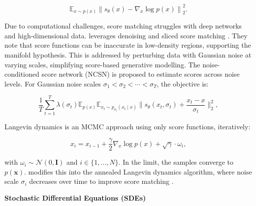 \documentclass[preprint,12pt,authoryear]{elsarticle}
\begin{document}
\begin{equation}
	\label{ncsn}
	\mathbb{E}_{x \sim p(x)}\left\|s_\theta(x)-\nabla_x \log p(x)\right\|_2^2 .
\end{equation}

Due to computational challenges, score matching struggles with deep networks and high-dimensional data. \cite{77_diffusion} leverages denoising and sliced score matching \cite{80_score_matching,79_sliced_score}. They note that score functions can be inaccurate in low-density regions, supporting the manifold hypothesis. This is addressed by perturbing data with Gaussian noise at varying scales, simplifying score-based generative modelling. The noise-conditioned score network (NCSN) is proposed to estimate scores across noise levels. For Gaussian noise scales $\sigma_1<\sigma_2<\cdots<\sigma_T$, the objective is:

\begin{equation}
	\frac{1}{T} \sum_{t=1}^T \lambda(\sigma_t) \mathbb{E}_{p(x)} \mathbb{E}_{x_t \sim p_{\sigma_t}(x_t \mid x)}\|s_\theta(x_t, \sigma_t)+\frac{x_t-x}{\sigma_t}\|_2^2,
\end{equation}

Langevin dynamics \cite{81_dynamics,82_dynamics} is an MCMC approach using only score functions, iteratively:

\begin{equation}
	\label{Langevin-eq}
	x_i=x_{i-1}+\frac{\gamma}{2} \nabla_x \log p(x)+\sqrt{\gamma} \cdot \omega_i,
\end{equation}

with $\omega_i \sim \mathcal{N}(0, \mathbf{I})$ and $i \in\{1, \ldots, N\}$. In the limit, the samples converge to $p(\mathbf{x})$. \cite{77_diffusion} modifies this into the annealed Langevin dynamics algorithm, where noise scale $\sigma_i$ decreases over time to improve score matching \cite{83_dynamics}.



\textbf{Stochastic Differential Equations (SDEs)}
\label{sde-eq}
\end{document}
